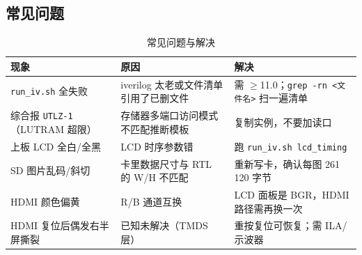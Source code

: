 \documentclass[withoutpreface,bwprint]{cumcmthesis}
\begin{document}
\subsection{常见问题}

\begin{table}[H]
\centering
\caption{常见问题与解决}
\label{tab:faq}
\begin{tabular}{p{3.8cm}p{3.6cm}p{5.8cm}}
\toprule[1.5pt]
\rowcolor{gray!25} 现象 & 原因 & 解决 \\
\midrule[1pt]
\texttt{run\_iv.sh} 全失败 & iverilog 太老或文件清单引用了已删文件 & 需 $\ge$11.0；\texttt{grep -rn <文件名>} 扫一遍清单 \\
综合报 \texttt{UTLZ-1}（LUTRAM 超限） & 存储器多端口访问模式不匹配推断模板 & 复制实例，不要加读口 \\
上板 LCD 全白/全黑 & LCD 时序参数错 & 跑 \texttt{run\_iv.sh lcd\_timing} \\
SD 图片乱码/斜切 & 卡里数据尺寸与 RTL 的 W/H 不匹配 & 重新写卡，确认每图 261\,120 字节 \\
HDMI 颜色偏黄 & R/B 通道互换 & LCD 面板是 BGR，HDMI 路径需再换一次 \\
HDMI 复位后偶发右半屏撕裂 & 已知未解决（TMDS 层） & 重按复位可恢复；需 ILA/示波器 \\
\bottomrule[1.5pt]
\end{tabular}
\end{table}
\end{document}
